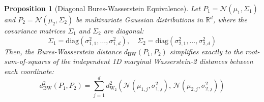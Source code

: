 \documentclass{article}
\theoremstyle{plain}
\newtheorem{proposition}[theorem]{Proposition}
\theoremstyle{definition}
\theoremstyle{remark}
\begin{document}
\begin{proposition}[Diagonal Bures-Wasserstein Equivalence]
Let $P_1 = \mathcal{N}(\mu_1, \Sigma_1)$ and $P_2 = \mathcal{N}(\mu_2, \Sigma_2)$ be multivariate Gaussian distributions in $\mathbb{R}^d$, where the covariance matrices $\Sigma_1$ and $\Sigma_2$ are diagonal:
\begin{equation}
  \Sigma_1 = \mathrm{diag}(\sigma_{1, 1}^2, \dots, \sigma_{1, d}^2), \quad \Sigma_2 = \mathrm{diag}(\sigma_{2, 1}^2, \dots, \sigma_{2, d}^2)
\end{equation}
Then, the Bures-Wasserstein distance $d_{\mathrm{BW}}(P_1, P_2)$ simplifies exactly to the root-sum-of-squares of the independent 1D marginal Wasserstein-2 distances between each coordinate:
\begin{equation}
  d_{\mathrm{BW}}^2(P_1, P_2) = \sum_{j=1}^d d_{\mathrm{W}_2}^2\left( \mathcal{N}(\mu_{1, j}, \sigma_{1, j}^2), \, \mathcal{N}(\mu_{2, j}, \sigma_{2, j}^2) \right)
\end{equation}
\end{proposition}
\end{document}
